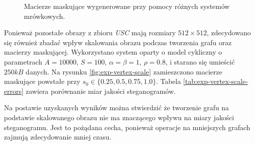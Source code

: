{{{\begin{figure}
                \caption[Porównania wizualizacji konwersji oraz macierzy maskujących.]
                {Macierze maskujące wygenerowane przy pomocy różnych systemów mrówkowych.}
                \label{fig:exp-vertex-pher}
            \end{figure}

            Ponieważ pozostałe obrazy z zbioru \textit{USC} mają rozmiary $512 \times 512$, zdecydowano się również
            zbadać wpływ skalowania obrazu podczas tworzenia grafu oraz macierzy maskującej. Wykorzystano system oparty
            o model cykliczny o parametrach $A=10000$, $S=100$, $\alpha=\beta=1$, $\rho=0.8$, i starano się umieścić
            $250kB$ danych. Na rysunku \ref{fig:exp-vertex-scale} zamieszczono macierze maskujące powstałe przy $s_0 \in
            \{0.25, 0.5, 0.75, 1.0\}$. Tabela \ref{tab:exp-vertex-scale-errors} zawiera porównanie miar jakości
            steganogramów.

            Na postawie uzyskanych wyników można stwierdzić że tworzenie grafu na podstawie skalowanego obrazu nie ma
            znaczącego wpływu na miary jakości steganogramu. Jest to pożądana cecha, ponieważ operacje na mniejszych
            grafach zajmują zdecydowanie mniej czasu.

}}}

